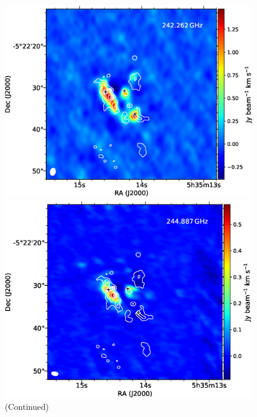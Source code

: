 \begin{figure}[H]
\begin{center}
\begin{minipage}{0.98\textwidth} 
\begin{center}
\begin{minipage}{0.48\textwidth}
\begin{center}
\includegraphics[width=0.98\textwidth]{OrionKL/mom0/242.262SV_mom0_3-7.eps}
\end{center}
\end{minipage}
\begin{minipage}{0.48\textwidth}
\begin{center}
\includegraphics[width=0.98\textwidth]{OrionKL/mom0/244.887mom0_3-7.eps}
\end{center}
\end{minipage}
\end{center}
\end{minipage}

\caption{(Continued)}
\end{center}
\end{figure}

